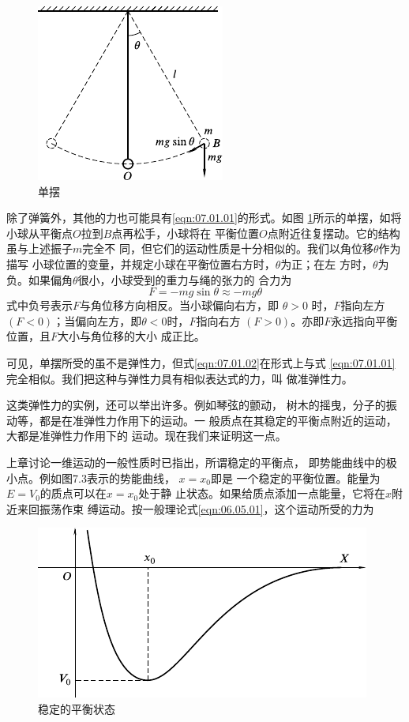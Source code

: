 \begin{figure}
  \centering
  \includegraphics{figure/fig07.02}
  \caption{单摆}
  \label{fig:07.02}
\end{figure}
除了弹簧外，其他的力也可能具有\eqref{eqn:07.01.01}的形式。如图
\ref{fig:07.02}\;所示的单摆，如将小球从平衡点$ O $拉到$ B $点再松手，小球将在
平衡位置$ O $点附近往复摆动。它的结构虽与上述振子$ m $完全不
同，但它们的运动性质是十分相似的。我们以角位移$ \theta $作为描写
小球位置的变量，并规定小球在平衡位置右方时，$ \theta $为正；在左
方时，$ \theta $为负。如果偏角$ \theta $很小，小球受到的重力与绳的张力的
合力为
\begin{equation}\label{eqn:07.01.02}
  F = - m g \sin \theta \approx - m g \theta
\end{equation}
式中负号表示$ F $与角位移方向相反。当小球偏向右方，即 $ \theta > 0 $
时，$ F $指向左方$ \left( F < 0 \right) $；当偏向左方，即$ \theta < 0 $时，$ F $指向右方
$ \left( F > 0 \right) $。亦即$ F $永远指向平衡位置，且$ F $大小与角位移的大小
成正比。

可见，单摆所受的虽不是弹性力，但式\eqref{eqn:07.01.02}在形式上与式
\eqref{eqn:07.01.01}完全相似。我们把这种与弹性力具有相似表达式的力，叫
做准弹性力。

这类弹性力的实例，还可以举出许多。例如琴弦的颤动，
树木的摇曳，分子的振动等，都是在准弹性力作用下的运动。一
般质点在其稳定的平衡点附近的运动，大都是准弹性力作用下的
运动。现在我们来证明这一点。

\clearpage
上章讨论一维运动的一般性质时已指出，所谓稳定的平衡点，
即势能曲线中的极小点。例如图7.3表示的势能曲线， $ x = x _ { 0 } $即是
一个稳定的平衡位置。能量为$ E = V _ 0 $的质点可以在$ x = x _ { 0 } $处于静
止状态。如果给质点添加一点能量，它将在$ x $附近来回振荡作束
缚运动。按一般理论式\eqref{eqn:06.05.01}，这个运动所受的力为

\begin{figure}[h]
  \centering
  \includegraphics{figure/fig07.03}
  \caption{稳定的平衡状态}
  \label{fig:07.03}
\end{figure}

